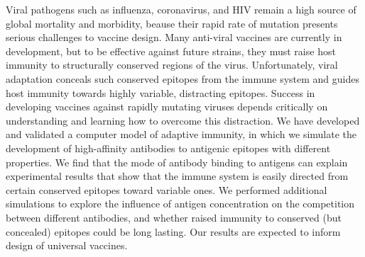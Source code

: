%
 Viral pathogens such as influenza, coronavirus, and HIV remain a high
 source of global mortality and morbidity, beause their rapid rate of
 mutation presents serious challenges to vaccine design.
%
 Many anti-viral vaccines are currently in development, but to be
 effective against future strains, they must raise host immunity to
 structurally conserved regions of the virus. Unfortunately, viral
 adaptation conceals such conserved epitopes from the immune system and
 guides host immunity towards highly variable, distracting epitopes.
 Success in developing vaccines against rapidly mutating viruses depends
 critically on understanding and learning how to overcome this distraction.
%
 We have developed and validated a computer model of adaptive
 immunity, in which we simulate the development of high-affinity
 antibodies to antigenic epitopes with different properties. 
%
 We find that the mode of antibody binding to antigens can explain
 experimental results that show that the immune system is easily
 directed from certain conserved epitopes toward variable ones.  We
 performed additional simulations to explore the influence of antigen
 concentration on the competition between different antibodies, and
 whether raised immunity to conserved (but concealed) epitopes could be
 long lasting. Our results are expected to inform design of universal vaccines.

